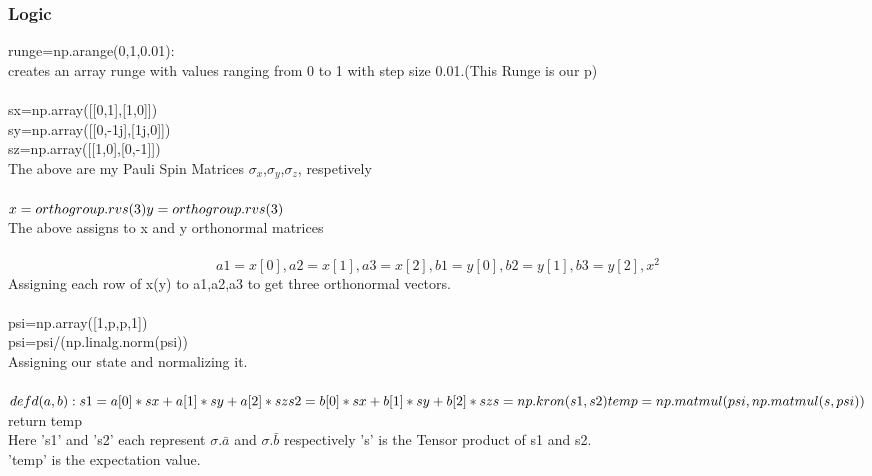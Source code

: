 \documentclass{article}
\begin{document}
  \subsubsection*{Logic}
   runge=np.arange(0,1,0.01):\\ creates an array runge with values 			ranging from 0 to 1 with step size 0.01.(This Runge is our p)\\\\
   sx=np.array([[0,1],[1,0]])\\
   sy=np.array([[0,-1j],[1j,0]])\\
   sz=np.array([[1,0],[0,-1]])\\
   The above are my Pauli Spin Matrices $\sigma_x$,$\sigma_y$,$\sigma_z$, 	respetively\\\\
   $x=orthogroup.rvs(3)\\
   y=orthogroup.rvs(3)$\\
   The above assigns to x and y orthonormal matrices\\\\
  \begin{displaymath}   
   a1=x[0], 
   a2=x[1], 
   a3=x[2], 
   b1=y[0], 
   b2=y[1], 
   b3=y[2],  
   x^2
  \end{displaymath}
  Assigning each row of x(y) to a1,a2,a3 to get three orthonormal 			vectors.\\\\
  psi=np.array([1,p,p,1])\\
  psi=psi/(np.linalg.norm(psi))\\
  Assigning our state and normalizing it.\\\\
  $    
   def d(a,b):\\
            s1=a[0]*sx+a[1]*sy+a[2]*sz\\
            s2=b[0]*sx+b[1]*sy+b[2]*sz\\
            s=np.kron(s1,s2)\\
            temp=np.matmul(psi,np.matmul(s,psi))$\\
            return temp\\
  Here 's1' and 's2' each represent $\sigma$.$\bar{a}$ and $\sigma$.$                      	\bar{b}$ respectively
  's' is the Tensor product of s1 and s2.\\
  'temp' is the expectation value.\\\\
     
\end{document}
